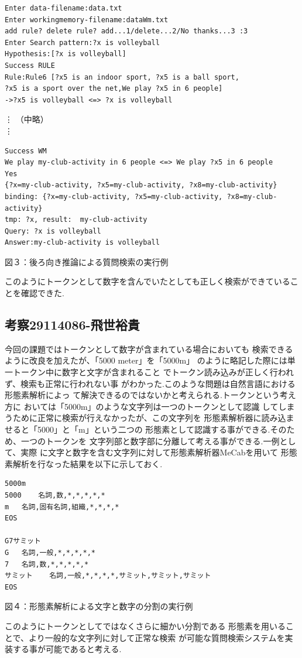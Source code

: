 \documentclass{jarticle}
\begin{document}
\begin{screen}
\begin{verbatim}
Enter data-filename:data.txt
Enter workingmemory-filename:dataWm.txt
add rule? delete rule? add...1/delete...2/No thanks...3 :3
Enter Search pattern:?x is volleyball
Hypothesis:[?x is volleyball]
Success RULE
Rule:Rule6 [?x5 is an indoor sport, ?x5 is a ball sport, 
?x5 is a sport over the net,We play ?x5 in 6 people]
->?x5 is volleyball <=> ?x is volleyball
\end{verbatim}
\vdots
（中略）\\
\vdots
\begin{verbatim}
Success WM
We play my-club-activity in 6 people <=> We play ?x5 in 6 people
Yes
{?x=my-club-activity, ?x5=my-club-activity, ?x8=my-club-activity}
binding: {?x=my-club-activity, ?x5=my-club-activity, ?x8=my-club-activity}
tmp: ?x, result:  my-club-activity
Query: ?x is volleyball
Answer:my-club-activity is volleyball
\end{verbatim}
\end{screen}
\begin{center}
図３：後ろ向き推論による質問検索の実行例\\
\end{center}

このようにトークンとして数字を含んでいたとしても正しく検索ができていることを確認できた.
\subsection{考察29114086-飛世裕貴}
今回の課題ではトークンとして数字が含まれている場合においても
検索できるように改良を加えたが、「5000 meter」を「5000m」
のように略記した際には単一トークン中に数字と文字が含まれること
でトークン読み込みが正しく行われず、検索も正常に行われない事
がわかった.このような問題は自然言語における形態素解析によっ
て解決できるのではないかと考えられる.トークンという考え方に
おいては「5000m」のような文字列は一つのトークンとして認識
してしまうために正常に検索が行えなかったが、この文字列を
形態素解析器に読み込ませると「5000」と「m」という二つの
形態素として認識する事ができる.そのため、一つのトークンを
文字列部と数字部に分離して考える事ができる.一例として、実際
に文字と数字を含む文字列に対して形態素解析器MeCabを用いて
形態素解析を行なった結果を以下に示しておく.\\

\begin{screen}
\begin{verbatim}
5000m
5000	名詞,数,*,*,*,*,*
m	名詞,固有名詞,組織,*,*,*,*
EOS

G7サミット
G	名詞,一般,*,*,*,*,*
7	名詞,数,*,*,*,*,*
サミット	名詞,一般,*,*,*,*,サミット,サミット,サミット
EOS
\end{verbatim}
\end{screen}
\begin{center}
図４：形態素解析による文字と数字の分割の実行例
\end{center}
このようにトークンとしてではなくさらに細かい分割である
形態素を用いることで、より一般的な文字列に対して正常な検索
が可能な質問検索システムを実装する事が可能であると考える.
\end{document}
